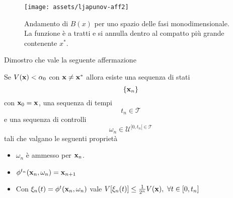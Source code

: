 \begin{steps}
    \hfill
    \begin{minipage}{.8\textwidth}
        \begin{figure}[H]
                \centering
                \texttt{[image: assets/ljapunov-aff2]}
                \caption[Andamento di $B(\b x)$]{Andamento di $B(x)$ per uno
                spazio delle fasi monodimensionale. La funzione è a tratti e
                si annulla dentro al compatto più grande contenente $x^*$.}
                \label{fig:ljapunov-aff2}
        \end{figure}
    \end{minipage}

    \item Dimostro che vale la seguente affermazione

    \begin{aff}
        Se $V(\mathbf{x}) < \alpha_0$ con $\mathbf{x} \neq \mathbf{x}^*$ allora esiste
        una sequenza di stati
        \begin{equation*}
        \{\mathbf{x}_n\}
        \end{equation*}
        con $\mathbf{x}_0 = \mathbf{x}$, una sequenza di tempi
        \begin{equation*}
        t_n \in \mathcal T
        \end{equation*}
        e una sequenza di controlli
        \begin{equation*}
            \omega_n \in \mathcal U^{[0, t_n[ \in \mathcal T}
        \end{equation*}
        tali che valgano le seguenti proprietà
        \begin{itemize}
            \item $\omega_n$ è ammesso per $\mathbf{x}_n$.
            \item $\phi^{t_n}(\mathbf{x}_n, \omega_n) = \mathbf{x}_{n+1}$
            \item Con $\xi_n(t) = \phi^t(\mathbf{x}_n, \omega_n)$ vale $V[\xi_n(t)] \leq \frac 1 {2^n} V(\mathbf{x}), \ \forall t \in [0, t_n]$
        \end{itemize}
    \end{aff}


\end{steps}
